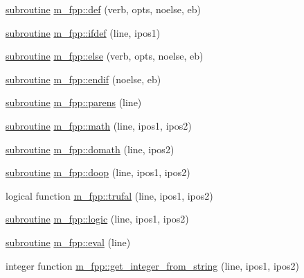 \begin{DoxyCompactItemize}
\item 
\hyperlink{M__stopwatch_83_8txt_acfbcff50169d691ff02d4a123ed70482}{subroutine} \hyperlink{namespacem__fpp_af80169d1e05b926eed9d4dbe10963084}{m\+\_\+fpp\+::def} (verb, opts, noelse, eb)
\item 
\hyperlink{M__stopwatch_83_8txt_acfbcff50169d691ff02d4a123ed70482}{subroutine} \hyperlink{namespacem__fpp_acc125ade915dbf457a06801f2e241306}{m\+\_\+fpp\+::ifdef} (line, ipos1)
\item 
\hyperlink{M__stopwatch_83_8txt_acfbcff50169d691ff02d4a123ed70482}{subroutine} \hyperlink{namespacem__fpp_aa7ce8afa566111e9b6f86922b9ec3205}{m\+\_\+fpp\+::else} (verb, opts, noelse, eb)
\item 
\hyperlink{M__stopwatch_83_8txt_acfbcff50169d691ff02d4a123ed70482}{subroutine} \hyperlink{namespacem__fpp_a943f646c7373dc0d88d4e6fe905fd90f}{m\+\_\+fpp\+::endif} (noelse, eb)
\item 
\hyperlink{M__stopwatch_83_8txt_acfbcff50169d691ff02d4a123ed70482}{subroutine} \hyperlink{namespacem__fpp_a4b9be76f637b58b358ee2a9ec95db933}{m\+\_\+fpp\+::parens} (line)
\item 
\hyperlink{M__stopwatch_83_8txt_acfbcff50169d691ff02d4a123ed70482}{subroutine} \hyperlink{namespacem__fpp_a7fe1c908c17895ebaa5afc2dc4cd1f1f}{m\+\_\+fpp\+::math} (line, ipos1, ipos2)
\item 
\hyperlink{M__stopwatch_83_8txt_acfbcff50169d691ff02d4a123ed70482}{subroutine} \hyperlink{namespacem__fpp_acf16ae34a4c7e769114656c3dbbe0640}{m\+\_\+fpp\+::domath} (line, ipos2)
\item 
\hyperlink{M__stopwatch_83_8txt_acfbcff50169d691ff02d4a123ed70482}{subroutine} \hyperlink{namespacem__fpp_a56d098fa1c69f9afbfbf0aacceed9fff}{m\+\_\+fpp\+::doop} (line, ipos1, ipos2)
\item 
logical function \hyperlink{namespacem__fpp_ad7c4d8aa34d0b35cd3b3ced65e261590}{m\+\_\+fpp\+::trufal} (line, ipos1, ipos2)
\item 
\hyperlink{M__stopwatch_83_8txt_acfbcff50169d691ff02d4a123ed70482}{subroutine} \hyperlink{namespacem__fpp_ae036546bab009c772421d3f4e34ca93c}{m\+\_\+fpp\+::logic} (line, ipos1, ipos2)
\item 
\hyperlink{M__stopwatch_83_8txt_acfbcff50169d691ff02d4a123ed70482}{subroutine} \hyperlink{namespacem__fpp_a7f223128c476778fa0334675c1431371}{m\+\_\+fpp\+::eval} (line)
\item 
integer function \hyperlink{namespacem__fpp_a3293bb9a959675261bda2b8f6fe3fa9e}{m\+\_\+fpp\+::get\+\_\+integer\+\_\+from\+\_\+string} (line, ipos1, ipos2)

\end{DoxyCompactItemize}
